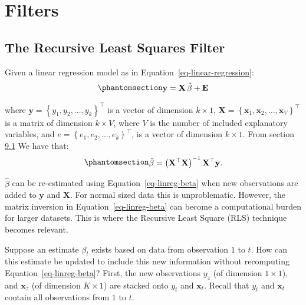 \documentclass[
  letterpaper,
  DIV=11,
  numbers=noendperiod]{scrreprt}
\begin{document}

\chapter{Filters}\label{filters}

\section{The Recursive Least Squares
Filter}\label{the-recursive-least-squares-filter}

Given a linear regression model as in
Equation~\ref{eq-linear-regression}:
\begin{equation}\protect\phantomsection\label{eq-gen-0096}{  
\begin{align}
    \mathbf{y} = \mathbf{X}\, \hat{\beta} + \mathbf{E}
\end{align}
}\end{equation}

where \(\mathbf{y}=\left\{y_1, y_2, \ldots, y_k\right\}^{\top}\) is a
vector of dimension \(k \times 1\),
\(\mathbf{X}=\left\{\mathbf{x}_1, \mathbf{x}_2, \ldots, \mathbf{x}_V \right\}^{\top}\)
is a matrix of dimension \(k \times V\), where \(V\) is the number of
included explanatory variables, and
\(e=\left\{e_1, e_2, \ldots, e_k \right\}^{\top}\), is a vector of
dimension \(k \times 1\). From section \hyperref[sec:linReg]{9.1} We
have that:
\begin{equation}\protect\phantomsection\label{eq-linreg-beta}{  
\begin{align}
    \hat{\beta} = \left( \mathbf{X}^{\top} \mathbf{X}\right)^{-1} \mathbf{X}^{\top}\mathbf{y}.
\end{align}
}\end{equation}

\(\hat{\beta}\) can be re-estimated using Equation~\ref{eq-linreg-beta}
when new observations are added to \(\mathbf{y}\) and \(\mathbf{X}\).
For normal sized data this is unproblematic. However, the matrix
inversion in Equation~\ref{eq-linreg-beta} can become a computational
burden for larger datasets. This is where the Recursive Least Square
(RLS) technique becomes relevant.

Suppose an estimate \(\beta_t\) exists based on data from observation
\(1\) to \(t\). How can this estimate be updated to include this new
information without recomputing Equation~\ref{eq-linreg-beta}? First,
the new observations \(y_{z}\) (of dimension \(1 \times 1\)), and
\(\mathbf{x}_{z}\) (of dimension \(K \times 1\)) are stacked onto
\(y_t\) and \(\mathbf{x}_t\). Recall that \(y_t\) and \(\mathbf{x}_t\)
contain all observations from \(1\) to \(t\).
\end{document}
